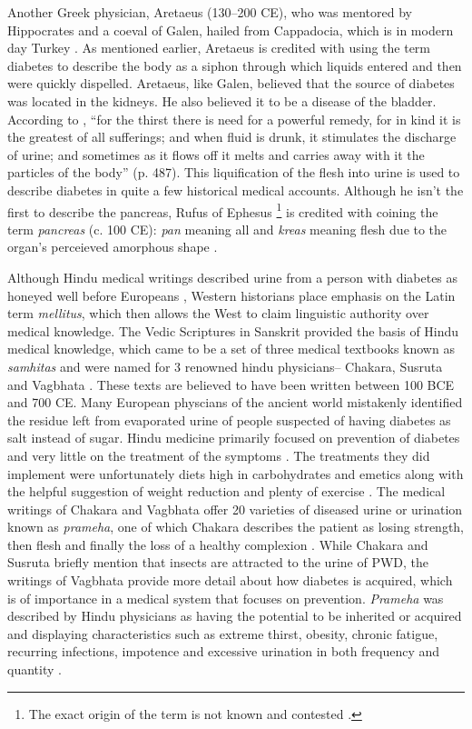 \documentclass[12pt]{article}
\begin{document}
Another Greek physician, Aretaeus (130--200 CE), who was mentored by Hippocrates and a coeval of Galen, hailed from Cappadocia, which is in modern day Turkey \citep{henschen_1969_term}. As mentioned earlier, Aretaeus is credited with using the term diabetes to describe the body as a siphon through which liquids entered and then were quickly dispelled. Aretaeus, like Galen, believed that the source of diabetes was located in the kidneys. He also believed it to be a disease of the bladder. According to \citet{aretaeus_1856_extant},
``for the thirst there is need for a powerful remedy, for in kind it is the greatest of all sufferings; and when fluid is drunk, it stimulates the discharge of urine; and sometimes as it flows off it melts and carries away with it the particles of the body'' (p. 487).  This liquification of the flesh into urine is used to describe diabetes in quite a few historical medical accounts. Although he isn't the first to describe the pancreas, Rufus of Ephesus \footnote {The exact origin of the term is not known and contested \citep{sanders_2001_philatelic}.} is credited with coining the term \textit{pancreas} (c. 100 CE): \textit{pan} meaning all and \textit{kreas} meaning flesh due to the organ's perceieved amorphous shape \citep{papaspyros_1964_history}. 

Although Hindu medical writings described urine from a person with diabetes as honeyed well before Europeans \citep{frank_1957_diabetes}, 
Western historians place emphasis on the Latin term \textit{mellitus}, which then allows the West to claim linguistic authority over medical knowledge. The Vedic Scriptures in Sanskrit provided the basis of Hindu medical knowledge, which came to be a set of three medical textbooks known as \textit{samhitas} and were named for 3 renowned hindu physicians-- Chakara, Susruta and Vagbhata \citep{frank_1957_diabetes}. These texts are believed to have been written between 100 BCE and 700 CE.  Many European physcians of the ancient world mistakenly identified the residue left from evaporated urine of people suspected of having diabetes as salt instead of sugar. Hindu medicine primarily focused on prevention of diabetes and very little on the treatment of the symptoms \citep{frank_1957_diabetes}. The treatments they did implement were unfortunately diets high in carbohydrates and emetics along with the helpful suggestion of weight reduction and plenty of exercise \citep{sanders_2001_philatelic}. The medical writings of Chakara and Vagbhata offer 20 varieties of diseased urine or urination known as \textit{prameha}, one of which Chakara describes the patient as losing strength, then flesh and finally the loss of a healthy complexion \citep{frank_1957_diabetes}. While Chakara and Susruta briefly mention that insects are attracted to the urine of PWD, the writings of Vagbhata provide more detail about how diabetes is acquired, which is of importance in a medical system that focuses on prevention. \textit{Prameha} was described by Hindu physicians as having the potential to be inherited or acquired and displaying characteristics \citep{frank_1957_diabetes} such as extreme thirst, obesity, chronic fatigue, recurring infections, impotence and excessive urination in both frequency and quantity \citep{frank_1957_diabetes}. 
\end{document}
